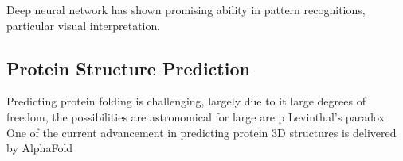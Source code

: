 Deep neural network has shown promising ability in pattern recognitions, particular visual interpretation.
\par 

\subsection{Protein Structure Prediction}
Predicting protein folding is challenging, largely due to it large degrees of freedom, the possibilities are astronomical for large  are p Levinthal's paradox One of the current advancement in predicting protein 3D structures is delivered by AlphaFold